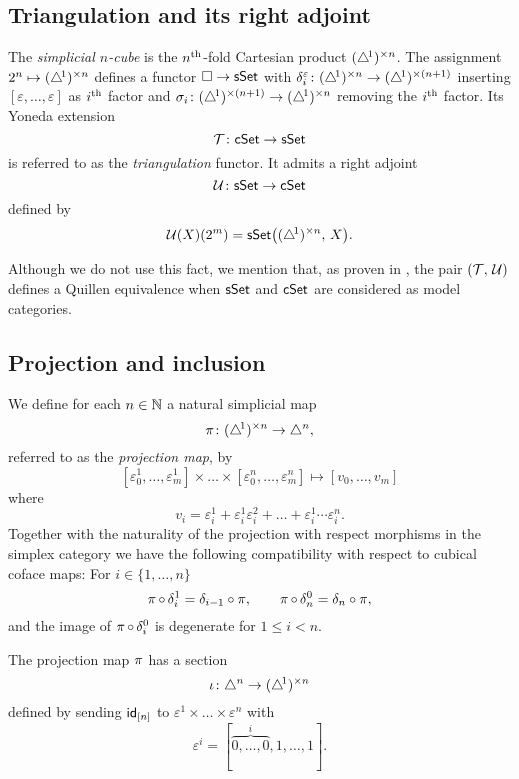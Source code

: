 \subsection{Triangulation and its right adjoint}

The \textit{simplicial $n$-cube} is the $n^{\mathrm{th}}$-fold Cartesian product $(\triangle^{\!1})^{\times n}$.
The assignment $2^n \mapsto (\triangle^{\!1})^{\times n}$ defines a functor $\square \to \mathsf{sSet}$ with $\delta_i^\varepsilon \colon (\triangle^{\!1})^{\times n} \to (\triangle^{\!1})^{\times (n+1)}$ inserting $[\varepsilon, \dots, \varepsilon]$ as $i^{\mathrm{th}}$ factor and $\sigma_i \colon (\triangle^{\!1})^{\times (n+1)} \to (\triangle^{\!1})^{\times n}$ removing the $i^{\mathrm{th}}$ factor.
Its Yoneda extension
\[
\operatorname{\mathcal{T}} \colon \mathsf{cSet} \to \mathsf{sSet}
\]
is referred to as the \textit{triangulation} functor.
It admits a right adjoint
\[
\operatorname{\mathcal{U}} \colon \mathsf{sSet} \to \mathsf{cSet}
\]
defined by
\[
\operatorname{\mathcal{U}}(X)(2^m) = \mathsf{sSet} \big( (\triangle^{\!1})^{\times n}, \, X \big).
\]

Although we do not use this fact, we mention that, as proven in \cite[\S 8.4.30]{cisinski2006presheaves}, the pair $(\operatorname{\mathcal{T}},\, \operatorname{\mathcal{U}})$ defines a Quillen equivalence when $\mathsf{sSet}$ and $\mathsf{cSet}$ are considered as model categories.

\subsection{Projection and inclusion} \label{ss:projection and inclusion}

We define for each $n \in \mathbb{N}$ a natural simplicial map
\[
\operatorname{\pi} \colon (\triangle^{\!1})^{\times n} \to \triangle^n,
\]
referred to as the \textit{projection map}, by
\[
[\varepsilon_0^1, \dots, \varepsilon_m^1] \times \dots \times [ \varepsilon_0^n, \dots, \varepsilon_m^n] \mapsto
[v_0, \dots, v_m]
\]
where
\[
v_i = \varepsilon_i^1 + \varepsilon_i^1 \varepsilon_i^2 + \dots + \varepsilon_i^1 \dotsm \varepsilon_i^n.
\]
Together with the naturality of the projection with respect morphisms in the simplex category we have the following compatibility with respect to cubical coface maps:
For $i \in \{1,\dots,n\}$
\begin{equation} \label{e:projection cubical compatibility}
\operatorname{\pi} \circ \, \delta_i^1 = \delta_{i-1} \circ \pi, \qquad
\operatorname{\pi} \circ \, \delta_n^0 = \delta_{n} \circ \pi,
\end{equation}
and the image of $\operatorname{\pi} \circ \, \delta^0_i$ is degenerate for $1 \leq i < n$.

The projection map $\operatorname{\pi}$ has a section
\[
\operatorname{\iota} \colon \triangle^n \to (\triangle^{\!1})^{\times n}
\]
defined by sending $\mathsf{id}_{[n]}$ to $\varepsilon^1 \times \dots \times \varepsilon^n$ with
\[
\varepsilon^i = [\overbrace{0, \dots, 0}^{i}, 1, \dots, 1].
\]

